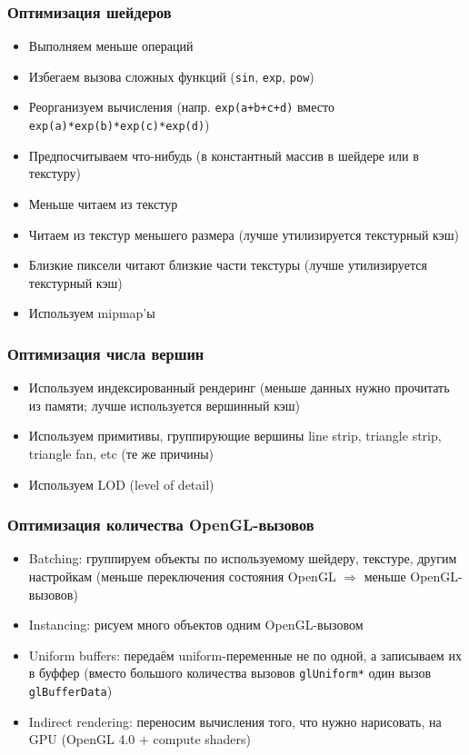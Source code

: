 \documentclass{beamer}
\begin{document}
\begin{frame}[fragile]
\fontsize{10pt}{10pt}
\frametitle{Оптимизация шейдеров}
\begin{itemize}
\item Выполняем меньше операций
\pause
\item Избегаем вызова сложных функций (\verb|sin|, \verb|exp|, \verb|pow|)
\pause
\item Реорганизуем вычисления (напр. \verb|exp(a+b+c+d)| вместо \verb|exp(a)*exp(b)*exp(c)*exp(d)|)
\pause
\item Предпосчитываем что-нибудь (в константный массив в шейдере или в текстуру)
\pause
\item Меньше читаем из текстур
\pause
\item Читаем из текстур меньшего размера (лучше утилизируется текстурный кэш)
\pause
\item Близкие пиксели читают близкие части текстуры (лучше утилизируется текстурный кэш)
\pause
\item Используем mipmap'ы
\end{itemize}
\end{frame}

\begin{frame}[fragile]
\frametitle{Оптимизация числа вершин}
\begin{itemize}
\item Используем индексированный рендеринг (меньше данных нужно прочитать из памяти; лучше используется вершинный кэш)
\pause
\item Используем примитивы, группирующие вершины \textendash{} line strip, triangle strip, triangle fan, etc (те же причины)
\pause
\item Используем LOD (level of detail)
\end{itemize}
\end{frame}

\begin{frame}[fragile]
\frametitle{Оптимизация количества OpenGL-вызовов}
\begin{itemize}
\item Batching: группируем объекты по используемому шейдеру, текстуре, другим настройкам (меньше переключения состояния OpenGL \begin{math}\Rightarrow\end{math} меньше OpenGL-вызовов)
\pause
\item Instancing: рисуем много объектов одним OpenGL-вызовом
\pause
\item Uniform buffers: передаём uniform-переменные не по одной, а записываем их в буффер (вместо большого количества вызовов \verb|glUniform*| один вызов \verb|glBufferData|)
\pause
\item Indirect rendering: переносим вычисления того, что нужно нарисовать, на GPU (OpenGL 4.0 + compute shaders)
\end{itemize}
\end{frame}
\end{document}
